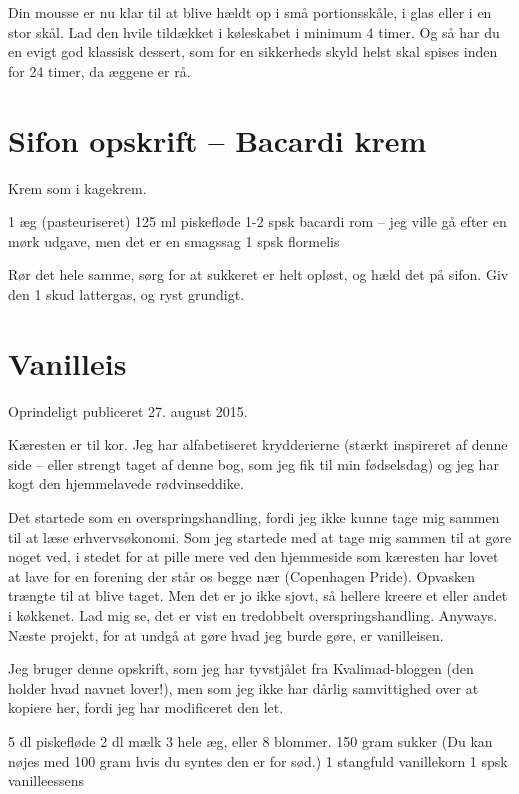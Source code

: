 \documentclass[
]{book}
\begin{document}
Din mousse er nu klar til at blive hældt op i små portionsskåle, i glas eller i en stor skål.
Lad den hvile tildækket i køleskabet i minimum 4 timer. Og så har du en evigt god
klassisk dessert, som for en sikkerheds skyld helst skal spises inden for 24 timer, da
æggene er rå.

\hypertarget{sifon-opskrift-bacardi-krem}{%
\section{Sifon opskrift -- Bacardi krem}\label{sifon-opskrift-bacardi-krem}}

Krem som i kagekrem.

1 æg (pasteuriseret)
125 ml piskefløde
1-2 spsk bacardi rom -- jeg ville gå efter en mørk udgave, men det er en smagssag
1 spsk flormelis

Rør det hele samme, sørg for at sukkeret er helt opløst, og hæld det på sifon. Giv den 1 skud lattergas, og ryst grundigt.

\hypertarget{vanilleis}{%
\section{Vanilleis}\label{vanilleis}}

Oprindeligt publiceret 27. august 2015.

Kæresten er til kor. Jeg har alfabetiseret krydderierne (stærkt inspireret af denne side -- eller strengt taget af denne bog, som jeg fik til min fødselsdag) og jeg har kogt den hjemmelavede rødvinseddike.

Det startede som en overspringshandling, fordi jeg ikke kunne tage mig sammen til at læse erhvervsøkonomi. Som jeg startede med at tage mig sammen til at gøre noget ved, i stedet for at pille mere ved den hjemmeside som kæresten har lovet at lave for en forening der står os begge nær (Copenhagen Pride). Opvasken trængte til at blive taget. Men det er jo ikke sjovt, så hellere kreere et eller andet i køkkenet. Lad mig se, det er vist en tredobbelt overspringshandling. Anyways. Næste projekt, for at undgå at gøre hvad jeg burde gøre, er vanilleisen.~

Jeg bruger denne opskrift, som jeg har tyvstjålet fra Kvalimad-bloggen (den holder hvad navnet lover!), men som jeg ikke har dårlig samvittighed over at kopiere her, fordi jeg har modificeret den let.

5 dl piskefløde
2 dl mælk
3 hele æg, eller 8 blommer.
150 gram sukker (Du kan nøjes med 100 gram hvis du syntes den er for sød.)
1 stangfuld vanillekorn
1 spsk vanilleessens
\end{document}
